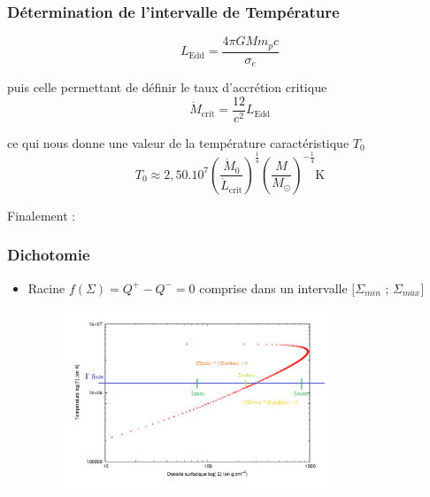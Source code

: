 \documentclass[french]{beamer}
\begin{document}

\begin{frame}
\frametitle{Détermination de l'intervalle de Température} 

   \begin{equation}
      L_\mathrm{Edd} = \frac{4\pi GMm_pc}{\sigma_e}
   \end{equation}

   puis celle permettant de définir le taux d’accrétion critique 
   \begin{equation}
      \dot{M}_\mathrm{crit} = \frac{12}{c^2}L_\mathrm{Edd} 
   \end{equation}

   ce qui nous donne une valeur de la température caractéristique $T_0$
   \begin{equation}
      T_0 \approx 2,50.10^7\left(\frac{\dot{M}_0}{\dot{L}_\mathrm{crit}}\right)^{\frac{1}{4}}\left(\frac{M}{M_\odot}\right)^{-\frac{1}{4}} \mathrm{K}
   \end{equation}

   Finalement : %

\end{frame}


\begin{frame}
\frametitle{Dichotomie}

   \begin{itemize}
      \item Racine $f(\Sigma) = Q^+ - Q^- = 0$ comprise dans un intervalle $[\Sigma_{min}$ ; $\Sigma_{max}]$
      \\
      \begin{figure}[htb!]
         \includegraphics[width=8cm]{figures/dicho_1.png}
      \end{figure}
   \end{itemize}
\end{frame}
\end{document}
